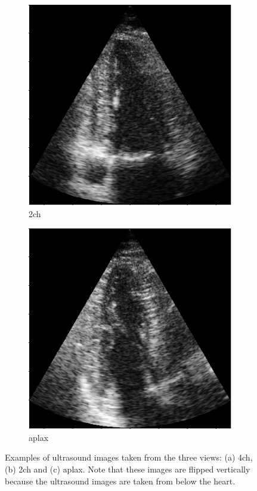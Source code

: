 \begin{figure}[H]
\begin{subfigure}[b]{0.3\textwidth}
        \includegraphics[width=0.99\textwidth]{echocardiography/2ch_frame.png}
        \caption{\acrshort{2ch}}
        \label{fig:us_view_examples_2ch}
    \end{subfigure}
    \begin{subfigure}[b]{0.3\textwidth}
        \includegraphics[width=0.99\textwidth]{echocardiography/aplax_frame.png}
        \caption{\acrshort{aplax}}
        \label{fig:us_view_examples_aplax}
    \end{subfigure}
    \caption{Examples of ultrasound images taken from the three views: (a) \acrfull{4ch}, (b) \acrfull{2ch} and (c) \acrfull{aplax}. Note that these images are flipped vertically because the ultrasound images are taken from below the heart.}
    \label{fig:us_view_examples}
\end{figure}

